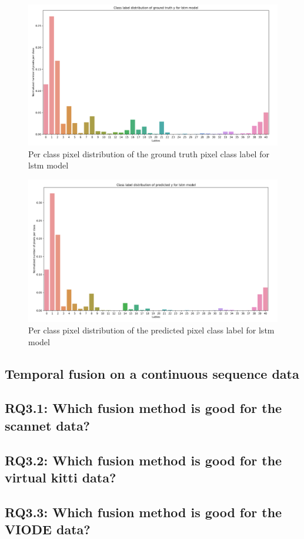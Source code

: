 	\begin{figure}
		\centering
		\includegraphics[width=16cm]{images/Y_ground_truth_lstm.png}
		\caption{Per class pixel distribution of the ground truth pixel class label for lstm model}
		\label{fig:y_gt_lstm}
	\end{figure}
	
	\begin{figure}
		\centering
		\includegraphics[width=16cm]{images/Y_predicted_lstm.png}
		\caption{Per class pixel distribution of the predicted pixel class label for lstm model}
		\label{fig:y_predi_lstm}
	\end{figure}
	
	\subsection{Temporal fusion on a continuous sequence data}
	
	
	
	
    \subsection{RQ3.1: Which fusion method is good for the scannet data?}
    \subsection{RQ3.2: Which fusion method is good for the virtual kitti data?}
    \subsection{RQ3.3: Which fusion method is good for the VIODE data?}
    

